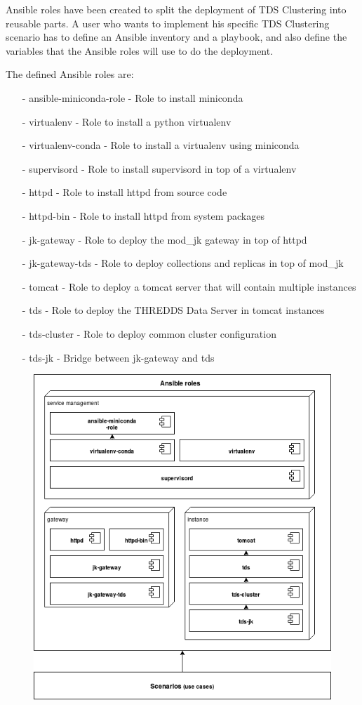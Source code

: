 \documentclass[a4paper,12pt]{article}
\begin{document}
Ansible roles have been created to split the deployment of TDS Clustering into reusable parts. A user who wants to implement his specific TDS Clustering scenario has to define an Ansible inventory and a playbook, and also define the variables that the Ansible roles will use to do the deployment.

The defined Ansible roles are:

\begin{itemize}
\item[-] ansible-miniconda-role - Role to install miniconda
\item[-] virtualenv - Role to install a python virtualenv
\item[-] virtualenv-conda - Role to install a virtualenv using miniconda
\item[-] supervisord - Role to install supervisord in top of a virtualenv
\item[-] httpd - Role to install httpd from source code
\item[-] httpd-bin - Role to install httpd from system packages
\item[-] jk-gateway - Role to deploy the mod\_jk gateway in top of httpd
\item[-] jk-gateway-tds - Role to deploy collections and replicas in top of mod\_jk
\item[-] tomcat - Role to deploy a tomcat server that will contain multiple instances
\item[-] tds - Role to deploy the THREDDS Data Server in tomcat instances
\item[-] tds-cluster - Role to deploy common cluster configuration
\item[-] tds-jk - Bridge between jk-gateway and tds
\end{itemize}

\begin{figure}[h]
\includegraphics[width=1\textwidth]{images/roles.png}
\end{figure}
\end{document}
